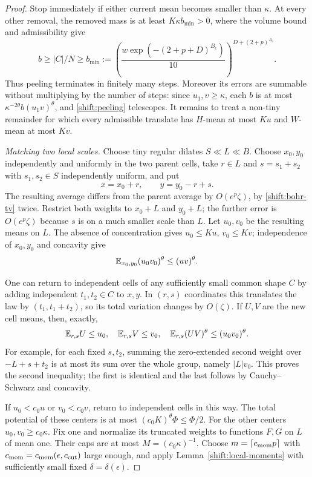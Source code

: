 \begin{proof}
Stop immediately if either current mean becomes smaller than $\kappa$.
At every other removal, the removed mass is at least
$K\kappa b_{\min}>0$, where the volume bound and admissibility give
\[
 b\geq |C|/N\geq b_{\min}:=
 \left(\frac{w\exp(-(2+p+D)^{B_\epsilon})}{10}\right)^{D+(2+p)^{A_\epsilon}}.
\]
Thus peeling terminates in finitely many steps.  Moreover its errors
are summable without multiplying by the number of steps: since
$u_1,v\geq\kappa$, each $b$ is at most
$\kappa^{-2\theta}b(u_1v)^\theta$, and
\eqref{shift:peeling} telescopes.
It remains to treat a non-tiny remainder for which every admissible
translate has $H$-mean at most $Ku$ and $W$-mean at most $Kv$.

\emph{Matching two local scales.}
Choose tiny regular dilates $S\ll L\ll B$. Choose $x_0,y_0$
independently and uniformly in the two parent cells, take
$r\in L$ and $s=s_1+s_2$ with $s_1,s_2\in S$ independently
uniform, and put
\[
 x=x_0+r,\qquad y=y_0-r+s.
\]
The resulting average differs from the parent average by
$O(e^p\zeta)$, by \eqref{shift:bohr-tv} twice.  Restrict both
weights to $x_0+L$ and $y_0+L$; the further error is
$O(e^p\zeta)$ because $s$ is on a much smaller scale than $L$.
Let $u_0,v_0$ be the resulting means on $L$.
The absence of concentration gives $u_0\leq Ku$, $v_0\leq Kv$;
independence of $x_0,y_0$ and concavity give
\begin{equation}\label{shift:matched-potential}
 \mathbb E_{x_0,y_0}(u_0v_0)^\theta\leq(uv)^\theta.
\end{equation}

One can return to independent cells of any sufficiently small common
shape $C$ by adding independent $t_1,t_2\in C$ to $x,y$.
In $(r,s)$ coordinates this translates the law by
$(t_1,t_1+t_2)$, so its total variation changes by $O(\zeta)$.
If $U,V$ are the new cell means, then, exactly,
\begin{equation}\label{shift:means-exact}
 \mathbb E_{r,s}U\leq u_0,\quad \mathbb E_{r,s}V\leq v_0,
 \quad \mathbb E_{r,s}(UV)^\theta\leq(u_0v_0)^\theta.
\end{equation}
For example, for each fixed $s,t_2$, summing the zero-extended second
weight over $-L+s+t_2$ is at most its sum over the whole group,
namely $|L|v_0$.  This proves the second inequality; the first is
identical and the last follows by Cauchy--Schwarz and concavity.

If $u_0<c_0u$ or $v_0<c_0v$, return to independent cells in this
way.  The total potential of these centers is at most
$(c_0K)^\theta\Phi\leq\Phi/2$.
For the other centers $u_0,v_0\geq c_0\kappa$.  Fix one and
normalize its truncated weights to functions $F,G$ on $L$ of mean
one.  Their caps are at most $M=(c_0\kappa)^{-1}$.
Choose $m=\lceil c_{\rm mom}p\rceil$ with
$c_{\rm mom}=c_{\rm mom}(\epsilon,c_{\rm cut})$ large enough, and apply
Lemma~\ref{shift:local-moments} with sufficiently small fixed
$\delta=\delta(\epsilon)$.


\end{proof}
